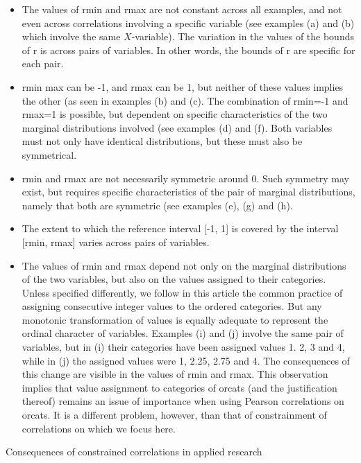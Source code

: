 \documentclass[
  12pt,
]{article}
\providecommand{\tightlist}{%
  \setlength{\itemsep}{0pt}\setlength{\parskip}{0pt}}
\theoremstyle{plain}
\theoremstyle{definition}
\theoremstyle{remark}
\begin{document}
\begin{itemize}
\tightlist
\item
  The values of rmin and rmax are not constant across all examples, and
  not even across correlations involving a specific variable (see
  examples (a) and (b) which involve the same \(X\)-variable). The
  variation in the values of the bounds of r is across pairs of
  variables. In other words, the bounds of r are specific for each pair.
\item
  rmin max can be -1, and rmax can be 1, but neither of these values
  implies the other (as seen in examples (b) and (c). The combination of
  rmin=-1 and rmax=1 is possible, but dependent on specific
  characteristics of the two marginal distributions involved (see
  examples (d) and (f). Both variables must not only have identical
  distributions, but these must also be symmetrical.
\item
  rmin and rmax are not necessarily symmetric around 0. Such symmetry
  may exist, but requires specific characteristics of the pair of
  marginal distributions, namely that both are symmetric (see examples
  (e), (g) and (h).\\
\item
  The extent to which the reference interval {[}-1, 1{]} is covered by
  the interval {[}rmin, rmax{]} varies across pairs of variables.
\item
  The values of rmin and rmax depend not only on the marginal
  distributions of the two variables, but also on the values assigned to
  their categories. Unless specified differently, we follow in this
  article the common practice of assigning consecutive integer values to
  the ordered categories. But any monotonic transformation of values is
  equally adequate to represent the ordinal character of variables.
  Examples (i) and (j) involve the same pair of variables, but in (i)
  their categories have been assigned values 1. 2, 3 and 4, while in (j)
  the assigned values were 1, 2.25, 2.75 and 4. The consequences of this
  change are visible in the values of rmin and rmax. This observation
  implies that value assignment to categories of orcats (and the
  justification thereof) remains an issue of importance when using
  Pearson correlations on orcats. It is a different problem, however,
  than that of constrainment of correlations on which we focus here.
\end{itemize}

Consequences of constrained correlations in applied research
\end{document}
